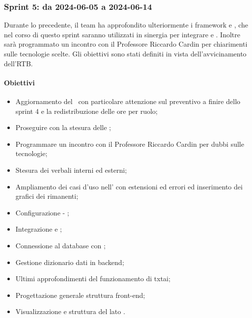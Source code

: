 \subsubsection{Sprint 5: da 2024-06-05 a 2024-06-14}
Durante lo  precedente, il team ha approfondito ulteriormente i framework  e , che nel corso di questo sprint saranno utilizzati in sinergia per integrare  e .
Inoltre sarà programmato un incontro con il Professore Riccardo Cardin per chiarimenti sulle tecnologie scelte. Gli obiettivi sono stati definiti in vista dell'avvicinamento dell'RTB. 


\paragraph{Obiettivi}
\begin{itemize}
  \item Aggiornamento del \PdP\ con particolare attenzione sul preventivo a finire dello sprint 4 e la redistribuzione delle ore per ruolo;
  \item Proseguire con la stesura delle \NdP;
  \item Programmare un incontro con il Professore Riccardo Cardin per dubbi sulle tecnologie;
  \item Stesura dei verbali interni ed esterni;
  \item Ampliamento dei casi d'uso nell' \AdR con estensioni ed errori ed inserimento dei grafici dei  rimanenti;
  \item Configurazione  - ;
  \item Integrazione  e ;
  \item Connessione al database con ;
  \item Gestione  dizionario dati in backend;
  \item Ultimi approfondimenti del funzionamento di txtai;
  \item Progettazione generale struttura front-end;
  \item Visualizzazione  e struttura del  lato .
\end{itemize}

\vspace{0.5\baselineskip}
\par [Inserire Gantt]